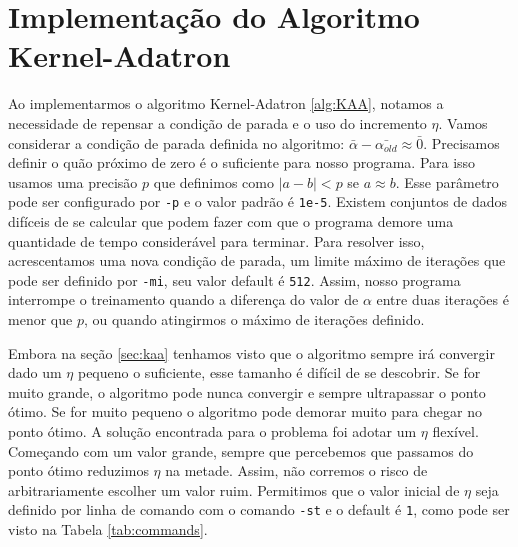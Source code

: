 \section{Implementação do Algoritmo Kernel-Adatron}


Ao implementarmos o algoritmo Kernel-Adatron \ref{alg:KAA}, notamos a necessidade de repensar a condição de parada e o uso do incremento $\eta$.
Vamos considerar a condição de parada definida no algoritmo: $\bar{\alpha}-\bar{\alpha_{old}}\approx \bar{0}$.
Precisamos definir o quão próximo de zero é o suficiente para nosso programa. Para isso usamos uma precisão $p$ que definimos como $|a-b|<p$ se $a\approx b$. Esse parâmetro pode ser configurado por \texttt{-p} e o valor padrão é \texttt{1e-5}.
Existem conjuntos de dados difíceis de se calcular que podem fazer com que o programa demore uma quantidade de tempo considerável para terminar. Para resolver isso, acrescentamos uma nova condição de parada, um limite máximo de iterações que pode ser definido por \texttt{-mi}, seu valor default é \texttt{512}. 
Assim, nosso programa interrompe o treinamento quando a diferença do valor de $\alpha$ entre duas iterações é menor que $p$, ou quando atingirmos o máximo de iterações definido.

Embora na seção \ref{sec:kaa} tenhamos visto que o algoritmo sempre irá convergir dado um $\eta$ pequeno o suficiente, esse tamanho é difícil de se descobrir. Se for muito grande, o algoritmo pode nunca convergir e sempre ultrapassar o ponto ótimo. Se for muito pequeno o algoritmo pode demorar muito para chegar no ponto ótimo. A solução encontrada para o problema foi adotar um $\eta$ flexível. Começando com um valor grande, sempre que percebemos que passamos do ponto ótimo reduzimos $\eta$ na metade. Assim, não corremos o risco de arbitrariamente escolher um valor ruim. Permitimos que o valor inicial de $\eta$ seja definido por linha de comando com o comando \texttt{-st} e o default é \texttt{1}, como pode ser visto na Tabela \ref{tab:commands}.

